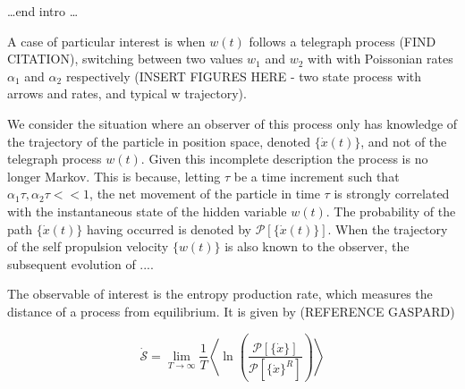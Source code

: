 \documentclass[%
 amsmath,amssymb,
]{revtex4-2}
\begin{document}

\ldots end intro \ldots

A case of particular interest is when $w(t)$ follows a telegraph process (FIND CITATION), switching between two values $w_1$ and $w_2$ with with Poissonian rates $\alpha_1$ and $\alpha_2$ respectively (INSERT FIGURES HERE - two state process with arrows and rates, and typical w trajectory).

We consider the situation where an observer of this process only has knowledge of the trajectory of the particle in position space, denoted $\{\dot{x}(t)\}$, and not of the telegraph process $w(t)$. Given this incomplete description the process is no longer Markov. This is because, letting $\tau$ be a time increment such that $\alpha_1\tau, \alpha_2\tau << 1$, the net movement of the particle in time $\tau$ is strongly correlated with the instantaneous state of the hidden variable $w(t)$.
The probability of the path $\{\dot{x}(t)\}$ having occurred is denoted by $\mathcal{P}\left[\{\dot{x}(t)\}\right]$. When the trajectory of the self propulsion velocity $\{w(t)\}$ is also known to the observer, the subsequent evolution of ....

The observable of interest is the entropy production rate, which measures the distance of a process from equilibrium. It is given by (REFERENCE GASPARD)

\begin{equation}\label{EP}
    \dot{\mathcal{S}} = \lim_{T \to \infty} \frac{1}{T}  \left\langle \ln\left(\frac{\mathcal{P}[\{\dot{x}\}]}{\mathcal{P}[\{\dot{x}\}^R]}\right) \right\rangle
\end{equation}
\end{document}
